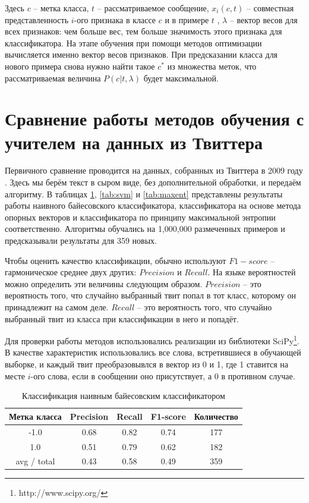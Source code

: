 Здесь $c$ -- метка класса, $t$ -- рассматриваемое сообщение, $x_i(c,t)$ -- совместная
представленность $i$-ого признака в классе $c$ и в примере $t$ , $\lambda$ -- вектор весов для всех
признаков: чем больше вес, тем больше значимость этого признака для классификатора. На этапе обучения
при помощи методов оптимизации вычисляется именно вектор весов признаков. При предсказании класса
для нового примера снова нужно найти такое $c^*$ из множества меток, что рассматриваемая величина $P(c|t,\lambda)$ будет максимальной.

\section{Сравнение работы методов обучения с учителем на данных из Твиттера}

Первичного сравнение проводится на данных, собранных из Твиттера в 2009 году
\cite{go2009twitter}. Здесь мы берём текст в сыром виде, без дополнительной обработки, и передаём
алгоритму. В таблицах \ref{tab:nb}, \ref{tab:svm} и \ref{tab:maxent} представлены результаты работы
наивного байесовского классификатора, классификатора на основе метода опорных векторов и
классификатора по принципу максимальной энтропии соответственно. Алгоритмы обучались на 1,000,000
размеченных примеров и предсказывали результаты для 359 новых.

Чтобы оценить качество классификации, обычно используют $F1-score$ -- гармоническое среднее двух
других: $Precision$ и $Recall$. На языке вероятностей можно определить эти величины следующим образом. $Precision$ -- это
вероятность того, что случайно выбранный твит попал в тот класс, которому он принадлежит
на самом деле. $Recall$ -- это вероятность того, что случайно выбранный твит из класса
при классификации в него и попадёт.

Для проверки работы методов использовались реализации из библиотеки
SciPy\footnote{http://www.scipy.org/}. В качестве характеристик использовались все слова,
встретившиеся в обучающей выборке, и каждый твит преобразовывлся в вектор из 0 и 1, где 1 ставится
на месте $i$-ого слова, если в сообщении оно присутствует, а 0 в противном случае.

\begin{table}[h]
  \begin{minipage}{\textwidth}
    \centering
    \begin{tabular}{|c|c|c|c|c|}
      \hline
      \textbf{Метка класса} & \textbf{Precision} & \textbf{Recall} & \textbf{F1-score} &
      \textbf{Количество} \\ \hline
      -1.0&0.68&0.82&0.74&177\\ \hline
      1.0&0.51&0.79&0.62&182\\ \hline \hline
      avg / total&0.43&0.58&0.49&359\\
      \hline
    \end{tabular}
    \caption{Классификация наивным байесовским классификатором}\label{tab:nb}
  \end{minipage}
\end{table}


